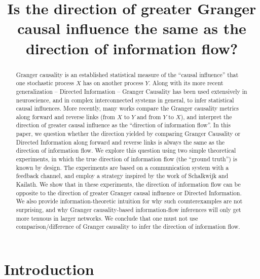 \documentclass[letterpaper, 10pt, conference]{ieeeconf}
\title{Is the direction of greater Granger causal influence the same as the direction of information flow?}
\author{\authorblockN{Praveen Venkatesh\authorrefmark{1} and Pulkit Grover\authorrefmark{2}}
\authorblockA{Dept.\ of Electrical and Computer Engineering, Carnegie Mellon University \\
\authorrefmark{1}vpraveen@cmu.edu, \authorrefmark{2}pulkit@cmu.edu}
}
\begin{document}
\maketitle


\begin{abstract}
	Granger causality is an established statistical measure of the ``causal influence'' that one stochastic process $X$ has on another process $Y$. Along with its more recent generalization -- Directed Information -- Granger Causality has been used extensively in neuroscience, and in complex interconnected systems in general, to infer statistical causal influences. More recently, many works compare the Granger causality metrics along forward and reverse links (from $X$ to $Y$ and from $Y$ to $X$), and interpret the direction of greater causal influence as the ``direction of information flow''. In this paper, we question whether the direction yielded by comparing Granger Causality or Directed Information along forward and reverse links is always the same as the direction of information flow. We explore this question using two simple theoretical experiments, in which the true direction of information flow (the ``ground truth'') is known by design. The experiments are based on a communication system with a feedback channel, and employ a strategy inspired by the work of Schalkwijk and Kailath. We show that in these experiments, the direction of information flow can be opposite to the direction of greater Granger causal influence or Directed Information. We also provide information-theoretic intuition for why such counterexamples are not surprising, and why Granger causality-based information-flow inferences will only get more tenuous in larger networks. We conclude that one must not use comparison/difference of Granger causality to infer the direction of information flow.
\end{abstract}

\IEEEpeerreviewmaketitle


\section{Introduction}
\label{sec:intro}

\end{document}
